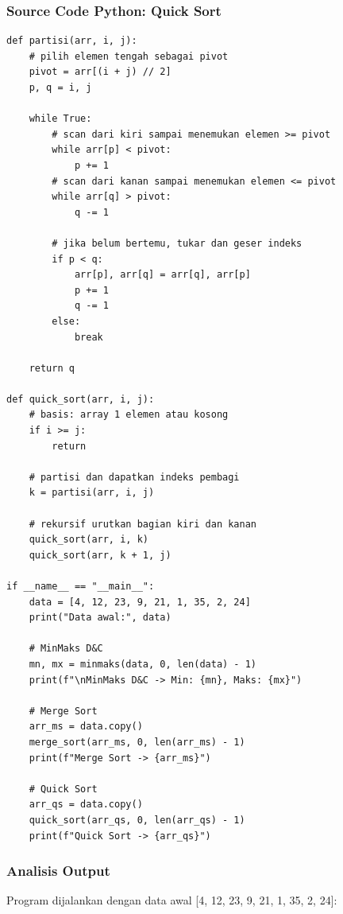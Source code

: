 \subsubsection*{Source Code Python: Quick Sort}
\begin{lstlisting}[basicstyle=\ttfamily\scriptsize, frame=single, backgroundcolor=\color{white}, numbers=none, keywordstyle=\color{black}, commentstyle=\color{black}, stringstyle=\color{black}, breaklines=true]
def partisi(arr, i, j):
    # pilih elemen tengah sebagai pivot
    pivot = arr[(i + j) // 2]
    p, q = i, j
    
    while True:
        # scan dari kiri sampai menemukan elemen >= pivot
        while arr[p] < pivot:
            p += 1
        # scan dari kanan sampai menemukan elemen <= pivot
        while arr[q] > pivot:
            q -= 1
            
        # jika belum bertemu, tukar dan geser indeks
        if p < q:
            arr[p], arr[q] = arr[q], arr[p]
            p += 1
            q -= 1
        else:
            break
            
    return q

def quick_sort(arr, i, j):
    # basis: array 1 elemen atau kosong
    if i >= j:
        return
        
    # partisi dan dapatkan indeks pembagi
    k = partisi(arr, i, j)
    
    # rekursif urutkan bagian kiri dan kanan
    quick_sort(arr, i, k)
    quick_sort(arr, k + 1, j)

if __name__ == "__main__":
    data = [4, 12, 23, 9, 21, 1, 35, 2, 24]
    print("Data awal:", data)
    
    # MinMaks D&C
    mn, mx = minmaks(data, 0, len(data) - 1)
    print(f"\nMinMaks D&C -> Min: {mn}, Maks: {mx}")
    
    # Merge Sort
    arr_ms = data.copy()
    merge_sort(arr_ms, 0, len(arr_ms) - 1)
    print(f"Merge Sort -> {arr_ms}")
    
    # Quick Sort
    arr_qs = data.copy()
    quick_sort(arr_qs, 0, len(arr_qs) - 1)
    print(f"Quick Sort -> {arr_qs}")
\end{lstlisting}

\subsubsection*{Analisis Output}
Program dijalankan dengan data awal [4, 12, 23, 9, 21, 1, 35, 2, 24]:

